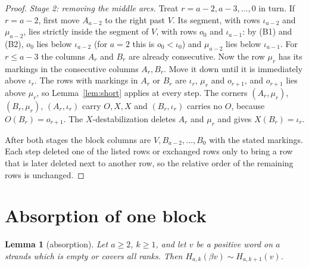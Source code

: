 \documentclass[11pt]{amsart}
\newtheorem{lemma}[theorem]{Lemma}
\theoremstyle{definition}
\theoremstyle{remark}
\newcommand{\Mov}{\mathrel{\sim}}
\begin{document}
\begin{proof}
\emph{Stage 2: removing the middle arcs.} Treat $r=a-2,a-3,\dots,0$ in turn. If $r=a-2$, first move
$A_{a-2}$ to the right past $V$. Its segment, with rows $\iota_{a-2}$ and $\mu_{a-2}$, lies strictly
inside the segment of $V$, with rows $o_0$ and $\iota_{a-1}$: by (B1) and (B2), $o_0$ lies below
$\iota_{a-2}$ (for $a=2$ this is $o_0<\iota_0$) and $\mu_{a-2}$ lies below $\iota_{a-1}$. For $r\le
a-3$ the columns $A_r$ and $B_r$ are already consecutive. Now the row $\mu_r$ has its markings in
the consecutive columns $A_r,B_r$. Move it down until it is immediately above $\iota_r$. The rows
with markings in $A_r$ or $B_r$ are $\iota_r$, $\mu_r$ and $o_{r+1}$, and $o_{r+1}$ lies above
$\mu_r$, so Lemma~\ref{lem:short} applies at every step. The corners $(A_r,\mu_r)$, $(B_r,\mu_r)$,
$(A_r,\iota_r)$ carry $O,X,X$ and $(B_r,\iota_r)$ carries no $O$, because $O(B_r)=o_{r+1}$. The
$X$-destabilization deletes $A_r$ and $\mu_r$ and gives $X(B_r)=\iota_r$.

After both stages the block columns are $V,B_{a-2},\dots,B_0$ with the stated markings. Each step
deleted one of the listed rows or exchanged rows only to bring a row that is later deleted next to
another row, so the relative order of the remaining rows is unchanged.
\end{proof}

\section{Absorption of one block}\label{sec:absorb}

\begin{lemma}[absorption]\label{lem:absorb}
Let $a\ge2$, $k\ge1$, and let $v$ be a positive word on $a$ strands which is empty or covers all
ranks. Then $H_{a,k}(\beta v)\Mov H_{a,k+1}(v)$.
\end{lemma}
\end{document}
